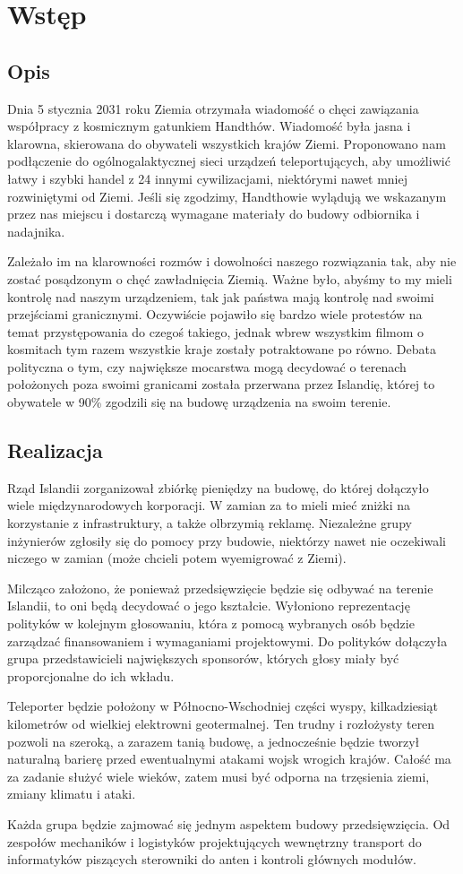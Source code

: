 \section{Wstęp}
\subsection{Opis}
Dnia 5 stycznia 2031 roku Ziemia otrzymała wiadomość o chęci zawiązania współpracy z kosmicznym gatunkiem Handthów.
Wiadomość była jasna i klarowna, skierowana do obywateli wszystkich krajów Ziemi.
Proponowano nam podłączenie do ogólnogalaktycznej sieci urządzeń teleportujących, aby umożliwić łatwy i szybki handel z 24 innymi cywilizacjami, niektórymi nawet mniej rozwiniętymi od Ziemi.
Jeśli się zgodzimy, Handthowie wylądują we wskazanym przez nas miejscu i dostarczą wymagane materiały do budowy odbiornika i nadajnika.

Zależało im na klarowności rozmów i dowolności naszego rozwiązania tak, aby nie zostać posądzonym o chęć zawładnięcia Ziemią.
Ważne było, abyśmy to my mieli kontrolę nad naszym urządzeniem, tak jak państwa mają kontrolę nad swoimi przejściami granicznymi.
Oczywiście pojawiło się bardzo wiele protestów na temat przystępowania do czegoś takiego, jednak wbrew wszystkim filmom o kosmitach tym razem wszystkie kraje zostały potraktowane po równo.
Debata polityczna o tym, czy największe mocarstwa mogą decydować o terenach położonych poza swoimi granicami została przerwana przez Islandię, której to obywatele w 90\% zgodzili się na budowę urządzenia na swoim terenie.

\subsection{Realizacja}
Rząd Islandii zorganizował zbiórkę pieniędzy na budowę, do której dołączyło wiele międzynarodowych korporacji.
W zamian za to mieli mieć zniżki na korzystanie z infrastruktury, a także olbrzymią reklamę.
Niezależne grupy inżynierów zgłosiły się do pomocy przy budowie, niektórzy nawet nie oczekiwali niczego w zamian (może chcieli potem wyemigrować z Ziemi).

Milcząco założono, że ponieważ przedsięwzięcie będzie się odbywać na terenie Islandii, to oni będą decydować o jego kształcie.
Wyłoniono reprezentację polityków w kolejnym głosowaniu, która z pomocą wybranych osób będzie zarządzać finansowaniem i wymaganiami projektowymi.
Do polityków dołączyła grupa przedstawicieli największych sponsorów, których głosy miały być proporcjonalne do ich wkładu.

Teleporter będzie położony w Północno-Wschodniej części wyspy, kilkadziesiąt kilometrów od wielkiej elektrowni geotermalnej.
Ten trudny i rozłożysty teren pozwoli na szeroką, a zarazem tanią budowę, a jednocześnie będzie tworzył naturalną barierę przed ewentualnymi atakami wojsk wrogich krajów.
Całość ma za zadanie służyć wiele wieków, zatem musi być odporna na trzęsienia ziemi, zmiany klimatu i ataki.

Każda grupa będzie zajmować się jednym aspektem budowy przedsięwzięcia.
Od zespołów mechaników i logistyków projektujących wewnętrzny transport do informatyków piszących sterowniki do anten i kontroli głównych modułów.
